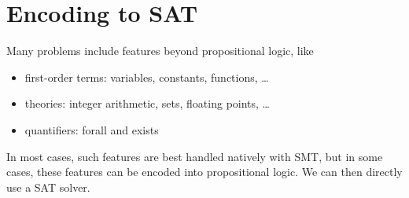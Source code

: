 \section{Encoding to SAT}
\begin{mytitle} Many problems include features beyond propositional logic, like
\begin{itemize}
    \item first-order terms: variables, constants, functions, \ldots
    \item theories: integer arithmetic, sets, floating points, \ldots
    \item quantifiers: forall and exists
\end{itemize}
In most cases, such features are best handled natively with SMT, but in some cases, these features can be encoded into propositional logic. We can then directly use a SAT solver.
\end{mytitle}

